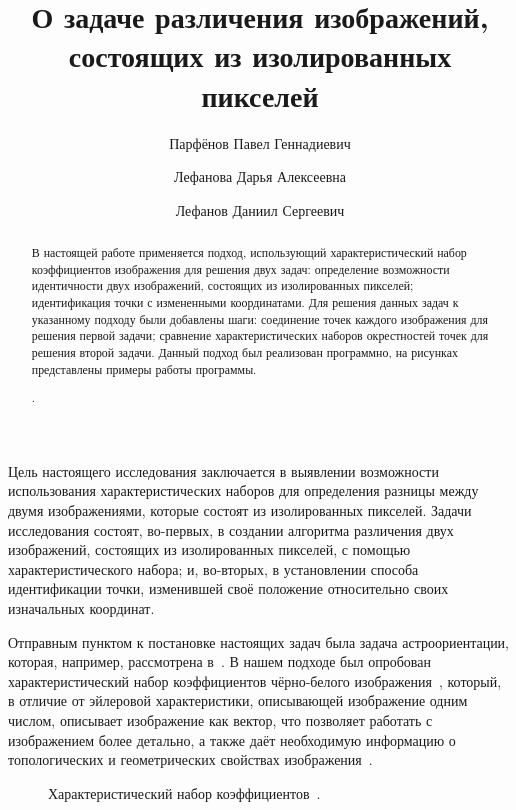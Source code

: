 \documentclass{csmathnotes}
\title{О задаче различения изображений, состоящих из изолированных пикселей}
\author{Парфёнов Павел Геннадиевич}
\author{Лефанова Дарья Алексеевна}
\author{Лефанов Даниил Сергеевич}
\affiliation{Ярославский государственный университет им. П.\,Г. Демидова}
\begin{document}
\maketitle

\begin{abstract}	
В настоящей работе применяется подход, использующий характеристический набор коэффициентов изображения для решения двух задач: определение возможности идентичности двух изображений, состоящих из изолированных пикселей; идентификация точки с измененными координатами. Для решения данных задач к указанному подходу были добавлены шаги: соединение точек каждого изображения для решения первой задачи; сравнение характеристических наборов окрестностей точек для решения второй задачи. Данный подход был реализован программно, на рисунках представлены примеры работы программы.

.
\end{abstract}

Цель настоящего исследования заключается в выявлении возможности использования характеристических наборов для определения разницы между двумя изображениями, которые состоят из изолированных пикселей. Задачи исследования состоят, во-первых, в создании алгоритма различения двух изображений, состоящих из изолированных пикселей, с помощью характеристического набора; и, во-вторых, в установлении способа идентификации точки, изменившей своё положение относительно своих изначальных координат.

Отправным пунктом к постановке настоящих задач была задача астроориентации, которая, например, рассмотрена в~\cite{1}. В нашем подходе был опробован характеристический набор коэффициентов чёрно-белого изображения~\cite{4}, который, в отличие от эйлеровой характеристики, описывающей изображение одним числом, описывает изображение как вектор, что позволяет работать с изображением более детально, а также даёт необходимую информацию о топологических и геометрических свойствах изображения~\cite{5}.

\begin{figure}[h!]
	\caption{Характеристический набор коэффициентов~\cite{3}.}
	\label{ris1}
\end{figure}
\end{document}
